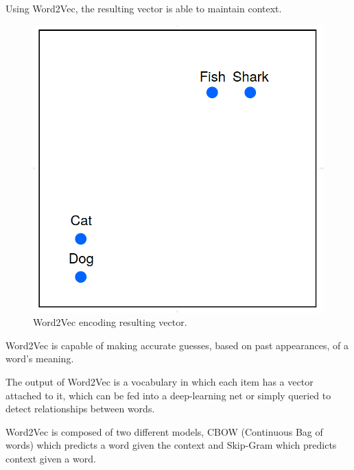         \par Using Word2Vec, the resulting vector is able to  maintain context.


        \begin{figure}[htb]
            \centering
            \includegraphics[scale = 0.1]{Sections/3StateOfTheArt/3_images/word2vec_encode.png}
            \caption{Word2Vec encoding resulting vector. \cite{word2vec_explained}}
        \end{figure}

        
        \par Word2Vec is capable of making accurate guesses, based on past appearances, of a word's meaning. 

        \par The output of Word2Vec is a vocabulary in which each item has a vector attached to it, which can be fed into a deep-learning net or simply queried to detect relationships between words.

        \par Word2Vec is composed of two different models, CBOW (Continuous Bag of words) which predicts a word given the context and Skip-Gram which predicts context given a word. \cite{Mikolov2013} \cite{Wiki}

        

